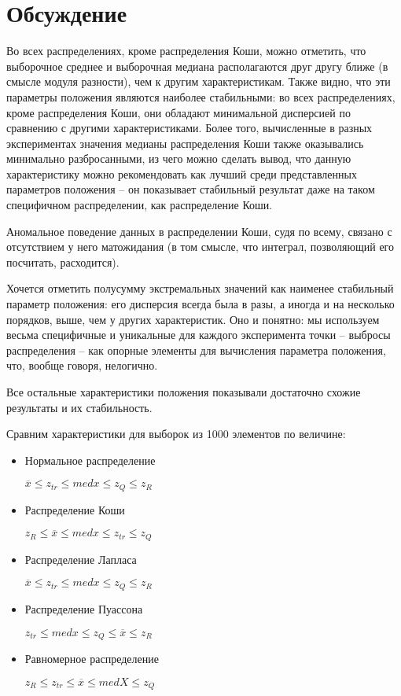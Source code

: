 \section{Обсуждение}

Во всех распределениях, кроме распределения Коши, можно отметить, что выборочное среднее и выборочная медиана располагаются друг другу ближе (в смысле модуля разности), чем к другим характеристикам. Также видно, что эти параметры положения являются наиболее стабильными: во всех распределениях, кроме распределения Коши, они обладают минимальной дисперсией по сравнению с другими характеристиками. Более того, вычисленные в разных экспериментах значения медианы распределения Коши также оказывались минимально разбросанными, из чего можно сделать вывод, что данную характеристику можно рекомендовать как лучший среди представленных параметров положения -- он показывает стабильный результат даже на таком специфичном распределении, как распределение Коши.

Аномальное поведение данных в распределении Коши, судя по всему, связано с отсутствием у него матожидания (в том смысле, что интеграл, позволяющий его посчитать, расходится).

Хочется отметить полусумму экстремальных значений как наименее стабильный параметр положения: его дисперсия всегда была в разы, а иногда и на несколько порядков, выше, чем у других характеристик. Оно и понятно: мы используем весьма специфичные и уникальные для каждого эксперимента точки -- выбросы распределения -- как опорные элементы для вычисления параметра положения, что, вообще говоря, нелогично.

Все остальные характеристики положения показывали достаточно схожие результаты и их стабильность.

Сравним характеристики для выборок из 1000 элементов по величине:
\begin{itemize}
	\item Нормальное распределение
	
	$\overline{x} \leq z_{tr} \leq med{x} \leq z_Q \leq z_R $
	
	\item Распределение Коши
	
	$z_R \leq \overline{x} \leq med{x} \leq z_{tr} \leq z_Q $
	
	\item Распределение Лапласа
	
	$ \overline{x} \leq z_{tr} \leq med{x} \leq z_Q \leq z_R $
	
	\item Распределение Пуассона
	
	$ z_{tr} \leq med{x} \leq z_Q \leq \overline{x} \leq z_R $
	
	\item Равномерное распределение
	
	$ z_R \leq z_{tr} \leq \overline{x} \leq med{X} \leq z_Q $
	
\end{itemize}

